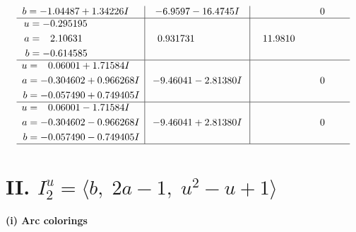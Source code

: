\documentclass[1p]{elsarticle_modified}
\theoremstyle{definition}
\begin{document}
$$\begin{array}{c|c|c}
\begin{aligned}
b &= -1.04487 + 1.34226 I\end{aligned}
 & -6.9597 - 16.4745 I & \phantom{-0.000000 } 0 \\ \hline\begin{aligned}
u &= -0.295195\phantom{ +0.000000I} \\
a &= \phantom{-}2.10631\phantom{ +0.000000I} \\
b &= -0.614585\phantom{ +0.000000I}\end{aligned}
 & \phantom{-}0.931731\phantom{ +0.000000I} & \phantom{-}11.9810\phantom{ +0.000000I} \\ \hline\begin{aligned}
u &= \phantom{-}0.06001 + 1.71584 I \\
a &= -0.304602 + 0.966268 I \\
b &= -0.057490 + 0.749405 I\end{aligned}
 & -9.46041 - 2.81380 I & \phantom{-0.000000 } 0 \\ \hline\begin{aligned}
u &= \phantom{-}0.06001 - 1.71584 I \\
a &= -0.304602 - 0.966268 I \\
b &= -0.057490 - 0.749405 I\end{aligned}
 & -9.46041 + 2.81380 I & \phantom{-0.000000 } 0\\
 \hline 
 \end{array}$$\newpage\newpage\renewcommand{\arraystretch}{1}
\centering \section*{II. $I^u_{2}= \langle b,\;2 a-1,\;u^2- u+1 \rangle$}
\flushleft \textbf{(i) Arc colorings}\\
\end{document}
